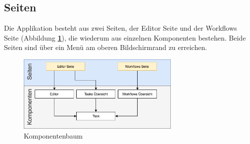         \subsection{Seiten}
        
        Die Applikation besteht aus zwei Seiten, der Editor Seite und der Workflows Seite (Abbildung \textbf{\ref{fig:Pages}}), die wiederum aus einzelnen Komponenten bestehen. Beide Seiten sind über ein Menü am oberen Bildschirmrand zu erreichen.
        
        \begin{figure}[h]
        \centering
        \includegraphics[width=0.7\textwidth]{images/ui_component_tree.png}
        \caption{Komponentenbaum}
        \label{fig:Pages}
        \end{figure}
        

